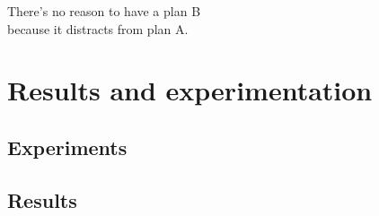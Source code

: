 
\begin{savequote}[60mm]
	There's no reason to have a plan B\\
	because it distracts from plan A.
\end{savequote}

\chapter{Results and experimentation}\label{chapter:results}
	
	\section{Experiments}
	
	\section{Results}